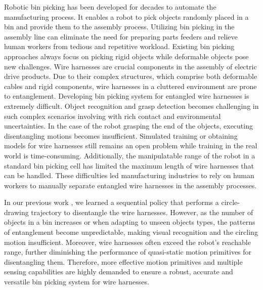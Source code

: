 \documentclass[letterpaper, 10 pt, conference]{ieeeconf}
\begin{document}
    Robotic bin picking has been developed for decades to automate the manufacturing process. It enables a robot to pick objects randomly placed in a bin and provide them to the assembly process. Utilizing bin picking in the assembly line can eliminate the need for preparing parts feeders and relieve human workers from tedious and repetitive workload. Existing bin picking approaches always focus on picking rigid objects \cite{kirkegaard2006bin,liu2012fast,buchholz2013efficient,domae2014fast,harada2016initial,matsumura2018learning,tachikake2020learning} while deformable objects pose new challenges. Wire harnesses are crucial components in the assembly of electric drive products. Due to their complex structures, which comprise both deformable cables and rigid components, wire harnesses in a cluttered environment are prone to entanglement. Developing bin picking system for entangled wire harnesses is extremely difficult. Object recognition and grasp detection becomes challenging in such complex scenarios involving with rich contact and environmental uncertainties. In the case of the robot grasping the end of the objects, executing disentangling motions becomes insufficient. Simulated training or obtaining models for wire harnesses still remains an open problem while training in the real world is time-consuming. Additionally, the manipulatable range of the robot in a standard bin picking cell has limited the maximum length of wire harnesses that can be handled. These difficulties led manufacturing industries to rely on human workers to manually separate entangled wire harnesses in the assembly processes. 
    
    In our previous work \cite{zhang2022learning}, we learned a sequential policy that performs a circle-drawing trajectory to disentangle the wire harnesses. However, as the number of objects in a bin increases or when adapting to unseen objects types, the patterns of entanglement become unpredictable, making visual recognition and the circling motion insufficient. Moreover, wire harnesses often exceed the robot's reachable range, further diminishing the performance of quasi-static motion primitives for disentangling them. Therefore, more effective motion primitives and multiple sensing capabilities are highly demanded to ensure a robust, accurate and versatile bin picking system for wire harnesses. 
    
    
    

    
    

\end{document}
